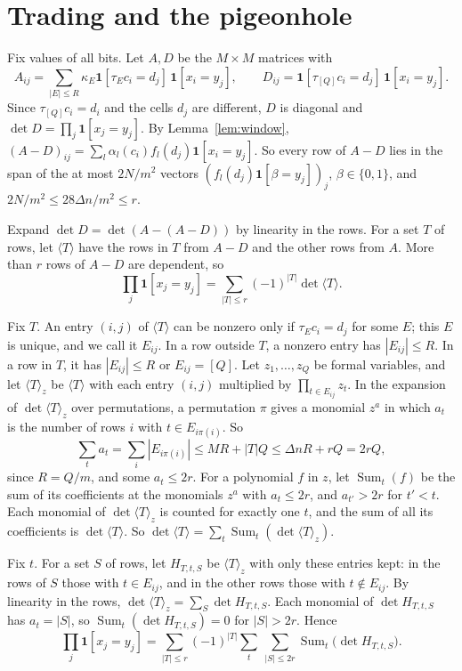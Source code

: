 \documentclass[10pt]{article}
\newcommand{\bits}{\{0,1\}}
\begin{document}
\section{Trading and the pigeonhole}

Fix values of all bits. Let $A,D$ be the $M\times M$ matrices with
\[
A_{ij}=\sum_{|E|\le R}\kappa_E\mathbf 1[\tau_Ec_i=d_j]\,\mathbf 1[x_i=y_j],\qquad D_{ij}=\mathbf 1[\tau_{[Q]}c_i=d_j]\,\mathbf 1[x_i=y_j].
\]
Since $\tau_{[Q]}c_i=d_i$ and the cells $d_j$ are different, $D$ is diagonal and $\det D=\prod_j\mathbf 1[x_j=y_j]$. By Lemma~\ref{lem:window}, $(A-D)_{ij}=\sum_l\alpha_l(c_i)f_l(d_j)\mathbf 1[x_i=y_j]$. So every row of $A-D$ lies in the span of the at most $2N/m^2$ vectors $(f_l(d_j)\mathbf 1[\beta=y_j])_j$, $\beta\in\bits$, and $2N/m^2\le28\Delta n/m^2\le r$.

Expand $\det D=\det(A-(A-D))$ by linearity in the rows. For a set $T$ of rows, let $\langle T\rangle$ have the rows in $T$ from $A-D$ and the other rows from $A$. More than $r$ rows of $A-D$ are dependent, so
\begin{equation}\label{trade}
\prod_j\mathbf 1[x_j=y_j]=\sum_{|T|\le r}(-1)^{|T|}\det\langle T\rangle.
\end{equation}

Fix $T$. An entry $(i,j)$ of $\langle T\rangle$ can be nonzero only if $\tau_Ec_i=d_j$ for some $E$; this $E$ is unique, and we call it $E_{ij}$. In a row outside $T$, a nonzero entry has $|E_{ij}|\le R$. In a row in $T$, it has $|E_{ij}|\le R$ or $E_{ij}=[Q]$. Let $z_1,\dots,z_Q$ be formal variables, and let $\langle T\rangle_z$ be $\langle T\rangle$ with each entry $(i,j)$ multiplied by $\prod_{t\in E_{ij}}z_t$. In the expansion of $\det\langle T\rangle_z$ over permutations, a permutation $\pi$ gives a monomial $z^a$ in which $a_t$ is the number of rows $i$ with $t\in E_{i\pi(i)}$. So
\[
\sum_ta_t=\sum_i|E_{i\pi(i)}|\le MR+|T|Q\le\Delta nR+rQ=2rQ,
\]
since $R=Q/m$, and some $a_t\le2r$. For a polynomial $f$ in $z$, let $\operatorname{Sum}_t(f)$ be the sum of its coefficients at the monomials $z^a$ with $a_t\le2r$, and $a_{t'}>2r$ for $t'<t$. Each monomial of $\det\langle T\rangle_z$ is counted for exactly one $t$, and the sum of all its coefficients is $\det\langle T\rangle$. So $\det\langle T\rangle=\sum_t\operatorname{Sum}_t(\det\langle T\rangle_z)$.

Fix $t$. For a set $S$ of rows, let $H_{T,t,S}$ be $\langle T\rangle_z$ with only these entries kept: in the rows of $S$ those with $t\in E_{ij}$, and in the other rows those with $t\notin E_{ij}$. By linearity in the rows, $\det\langle T\rangle_z=\sum_S\det H_{T,t,S}$. Each monomial of $\det H_{T,t,S}$ has $a_t=|S|$, so $\operatorname{Sum}_t(\det H_{T,t,S})=0$ for $|S|>2r$. Hence
\begin{equation}\label{sum}
\prod_j\mathbf 1[x_j=y_j]=\sum_{|T|\le r}(-1)^{|T|}\sum_t\ \sum_{|S|\le2r}\operatorname{Sum}_t\bigl(\det H_{T,t,S}\bigr).
\end{equation}
\end{document}
